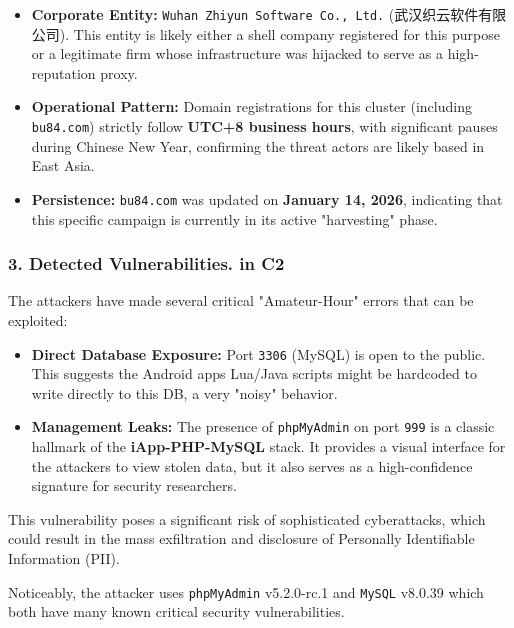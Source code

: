 \documentclass[
]{article}
\begin{document}
\begin{itemize}
\item
  \textbf{Corporate Entity:}
  \texttt{Wuhan\ Zhiyun\ Software\ Co.,\ Ltd.} (武汉织云软件有限公司).
  This entity is likely either a shell company registered for this
  purpose or a legitimate firm whose infrastructure was hijacked to
  serve as a high-reputation proxy.
\item
  \textbf{Operational Pattern:} Domain registrations for this cluster
  (including \texttt{bu84.com}) strictly follow \textbf{UTC+8 business
  hours}, with significant pauses during Chinese New Year, confirming
  the threat actors are likely based in East Asia.
\item
  \textbf{Persistence:} \texttt{bu84.com} was updated on \textbf{January
  14, 2026}, indicating that this specific campaign is currently in its
  active "harvesting" phase.
\end{itemize}

\subsubsection{3. Detected Vulnerabilities. in
C2}\label{3-detected-vulnerabilities-in-c2}

The attackers have made several critical "Amateur-Hour" errors that can
be exploited:

\begin{itemize}
\item
  \textbf{Direct Database Exposure:} Port \texttt{3306} (MySQL) is open
  to the public. This suggests the Android app\textquotesingle s
  Lua/Java scripts might be hardcoded to write directly to this DB, a
  very "noisy" behavior.
\item
  \textbf{Management Leaks:} The presence of \texttt{phpMyAdmin} on port
  \texttt{999} is a classic hallmark of the \textbf{iApp-PHP-MySQL}
  stack. It provides a visual interface for the attackers to view stolen
  data, but it also serves as a high-confidence signature for security
  researchers.
\end{itemize}

This vulnerability poses a significant risk of sophisticated
cyberattacks, which could result in the mass exfiltration and disclosure
of Personally Identifiable Information (PII).

Noticeably, the attacker uses \texttt{phpMyAdmin} v5.2.0-rc.1 and
\texttt{MySQL} v8.0.39 which both have many known critical security
vulnerabilities.
\end{document}
